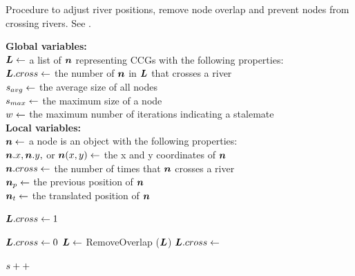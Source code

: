 \begin{algorithm}[tb!]
    \caption{Procedure to adjust river positions, remove node overlap and prevent nodes from crossing rivers. See .}\label{alg:UpdateLayout}
    \textbf{Global variables:} \\
    $ \bm{L} \gets $ a list of $ \bm{n} $ representing CCGs with the following properties: \\
    \-\hspace{1em}  $\bm{L}.cross \gets $ the number of $ \bm{n} $ in $ \bm{L} $ that crosses a river \\
    $ s_{avg} \gets $ the average size of all nodes \\
    $ s_{max} \gets $ the maximum size of a node \\
    $ w \gets $ the maximum number of iterations indicating a stalemate \\

    \textbf{Local variables:} \\
    $ \bm{n} \gets $ a node is an object with the following properties: \\
    \-\hspace{1em} $ \bm{n}.x, \bm{n}.y, $ or $ \bm{n}(x,y) \gets $ the x and y coordinates of $ \bm{n} $ \\
    \-\hspace{1em} $ \bm{n}.cross \gets $ the number of times that $ \bm{n} $ crosses a river \\
    \-\hspace{1em} $ \bm{n}_{p} \gets $ the previous position of $ \bm{n} $ \\
    \-\hspace{1em} $ \bm{n}_t \gets $ the translated position of $ \bm{n} $ \\

    \begin{algorithmic}[1]
        \While{$ \nodeSizeAvg < \nodeSizeMax $}
        \State $ \bm{L}.cross \gets 1 $ 

        \State $ \bm{L}.cross \gets 0 $
        \State $ \bm{L} \gets $ RemoveOverlap ($ \bm{L} $)
        \State {}
        \State $\bm{L}.cross \gets $ 

        \EndWhile

        \State $ s ++ $

        \EndWhile

        \EndProcedure
    \end{algorithmic}
\end{algorithm}


